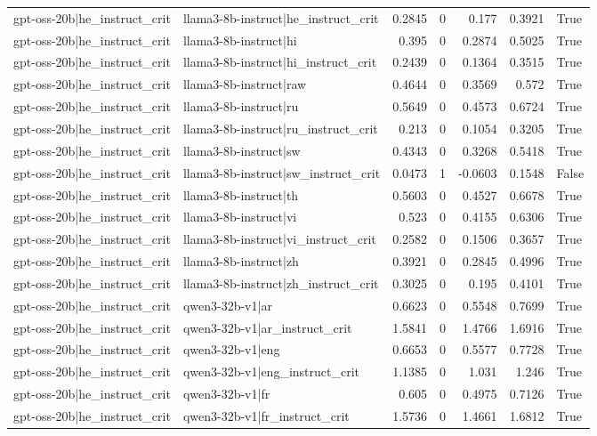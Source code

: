 \begin{table}
\begin{tabular}{l l r r r r l}
gpt-oss-20b|he_instruct_crit & llama3-8b-instruct|he_instruct_crit & 0.2845 & 0 & 0.177 & 0.3921 & True \\
gpt-oss-20b|he_instruct_crit & llama3-8b-instruct|hi & 0.395 & 0 & 0.2874 & 0.5025 & True \\
gpt-oss-20b|he_instruct_crit & llama3-8b-instruct|hi_instruct_crit & 0.2439 & 0 & 0.1364 & 0.3515 & True \\
gpt-oss-20b|he_instruct_crit & llama3-8b-instruct|raw & 0.4644 & 0 & 0.3569 & 0.572 & True \\
gpt-oss-20b|he_instruct_crit & llama3-8b-instruct|ru & 0.5649 & 0 & 0.4573 & 0.6724 & True \\
gpt-oss-20b|he_instruct_crit & llama3-8b-instruct|ru_instruct_crit & 0.213 & 0 & 0.1054 & 0.3205 & True \\
gpt-oss-20b|he_instruct_crit & llama3-8b-instruct|sw & 0.4343 & 0 & 0.3268 & 0.5418 & True \\
gpt-oss-20b|he_instruct_crit & llama3-8b-instruct|sw_instruct_crit & 0.0473 & 1 & -0.0603 & 0.1548 & False \\
gpt-oss-20b|he_instruct_crit & llama3-8b-instruct|th & 0.5603 & 0 & 0.4527 & 0.6678 & True \\
gpt-oss-20b|he_instruct_crit & llama3-8b-instruct|vi & 0.523 & 0 & 0.4155 & 0.6306 & True \\
gpt-oss-20b|he_instruct_crit & llama3-8b-instruct|vi_instruct_crit & 0.2582 & 0 & 0.1506 & 0.3657 & True \\
gpt-oss-20b|he_instruct_crit & llama3-8b-instruct|zh & 0.3921 & 0 & 0.2845 & 0.4996 & True \\
gpt-oss-20b|he_instruct_crit & llama3-8b-instruct|zh_instruct_crit & 0.3025 & 0 & 0.195 & 0.4101 & True \\
gpt-oss-20b|he_instruct_crit & qwen3-32b-v1|ar & 0.6623 & 0 & 0.5548 & 0.7699 & True \\
gpt-oss-20b|he_instruct_crit & qwen3-32b-v1|ar_instruct_crit & 1.5841 & 0 & 1.4766 & 1.6916 & True \\
gpt-oss-20b|he_instruct_crit & qwen3-32b-v1|eng & 0.6653 & 0 & 0.5577 & 0.7728 & True \\
gpt-oss-20b|he_instruct_crit & qwen3-32b-v1|eng_instruct_crit & 1.1385 & 0 & 1.031 & 1.246 & True \\
gpt-oss-20b|he_instruct_crit & qwen3-32b-v1|fr & 0.605 & 0 & 0.4975 & 0.7126 & True \\
gpt-oss-20b|he_instruct_crit & qwen3-32b-v1|fr_instruct_crit & 1.5736 & 0 & 1.4661 & 1.6812 & True \\

\end{tabular}
\end{table}
